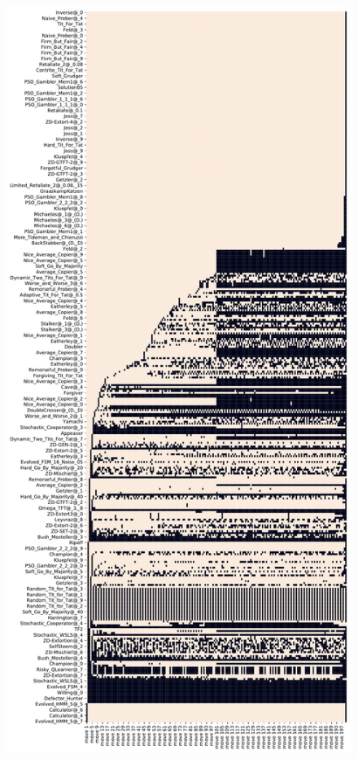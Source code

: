 \begin{appendices}
\begin{figure}[ht]
\begin{minipage}{0.48\textwidth}
        \includegraphics[width=1.0\textwidth, center]{./img/descriptive/sequence_plot_alphabetical_pt1.pdf}

\end{minipage}
\end{figure}
\end{appendices}
